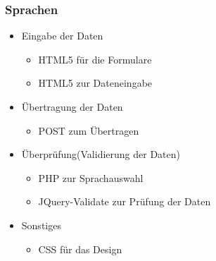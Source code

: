 \begin{frame} %
  \frametitle{Sprachen} %

   \begin{itemize}
    \item Eingabe der Daten
    \begin{itemize}
     \item HTML5 für die Formulare
	 \item HTML5 zur Dateneingabe
    \end{itemize}

    \item Übertragung der Daten
    \begin{itemize}
     \item POST zum Übertragen
    \end{itemize}

    \item Überprüfung(Validierung der Daten)
    \begin{itemize}
     \item PHP zur Sprachauswahl
     \item JQuery-Validate zur Prüfung der Daten
    \end{itemize}

    \item Sonstiges
    \begin{itemize}
     \item CSS für das Design
    \end{itemize}

   \end{itemize}

\end{frame}